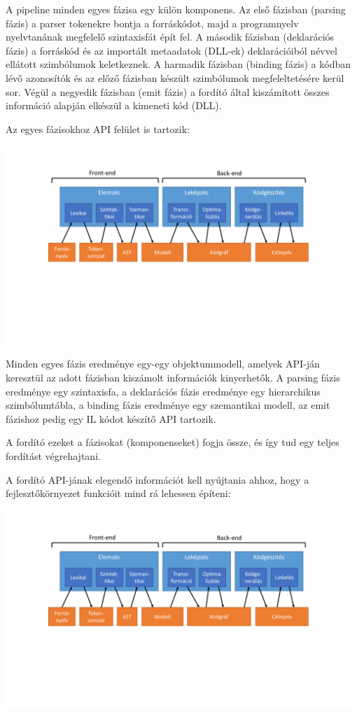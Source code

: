 \documentclass[12pt, a4paper]{report}
\begin{document}
A pipeline minden egyes fázisa egy külön komponens. Az első fázisban (parsing fázis) a parser tokenekre bontja a forráskódot, majd a programnyelv nyelvtanának megfelelő szintaxisfát épít fel. A második fázisban (deklarációs fázis) a forráskód és az importált metaadatok (DLL-ek) deklarációiból névvel ellátott szimbólumok keletkeznek. A harmadik fázisban (binding fázis) a kódban lévő azonosítók és az előző fázisban készült szimbólumok megfeleltetésére kerül sor. Végül a negyedik fázisban (emit fázis) a fordító által kiszámított összes információ alapján elkészül a kimeneti kód (DLL).

Az egyes fázisokhoz API felület is tartozik:

\begin{center}\includegraphics[trim=120 100 160 260,clip,width=\textwidth,page=3]{Images.pdf}\end{center}

Minden egyes fázis eredménye egy-egy objektummodell, amelyek API-ján keresztül az adott fázisban kiszámolt információk kinyerhetők. A parsing fázis eredménye egy szintaxisfa, a deklarációs fázis eredménye egy hierarchikus szimbólumtábla, a binding fázis eredménye egy szemantikai modell, az emit fázishoz pedig egy IL kódot készítő API tartozik.

A fordító ezeket a fázisokat (komponenseket) fogja össze, és így tud egy teljes fordítást végrehajtani.

A fordító API-jának elegendő információt kell nyújtania ahhoz, hogy a fejlesztőkörnyezet funkcióit mind rá lehessen építeni:

\begin{center}\includegraphics[trim=120 100 160 90,clip,width=\textwidth,page=3]{Images.pdf}\end{center}
\end{document}
